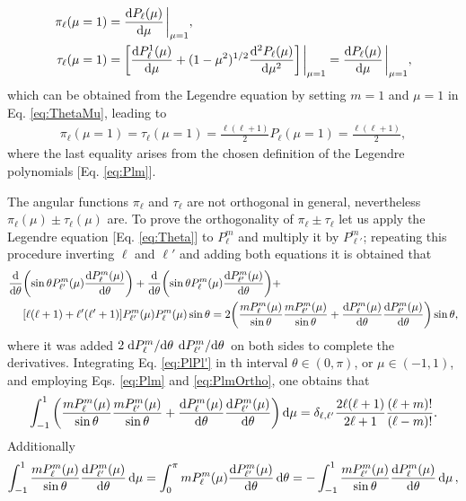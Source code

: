 %
\begin{align}
\pi_\ell(\mu=1) & =  \dv{P_\ell(\mu)}{\mu}\eval_{\mu=1},\\
\tau_\ell (\mu = 1) & = \qty[\dv{P_\ell^1(\mu)}{\mu} + (1-\mu^2)^{1/2}\dv[2]{P_\ell(\mu)}{\mu}]\eval_{\mu=1} = \dv{P_\ell(\mu)}{\mu}\eval_{\mu=1},
\end{align}
%
which can be obtained from the Legendre equation  by setting $m = 1$ and $\mu = 1$ in Eq. \eqref{eq:ThetaMu}, leading to
%
\begin{align}
    \pi_\ell(\mu=1) = \tau_\ell(\mu=1) = \frac{\ell(\ell+1)}{2} P_\ell(\mu = 1) = \frac{\ell(\ell+1)}{2},
    \label{eq:PiTau1}
\end{align}
%
where the last equality arises from the chosen definition of the Legendre polynomials [Eq. \eqref{eq:Plm}].

The angular functions $\pi_\ell$  and $\tau_\ell$ are not orthogonal in general, nevertheless  $\pi_\ell(\mu)\pm\tau_\ell(\mu)$ are. To prove the orthogonality of $\pi_\ell\pm\tau_\ell$ let us apply the Legendre equation [Eq. \eqref{eq:Theta}] to $P_\ell^m$ and multiply it by $P_{\ell'}^m$; repeating this procedure inverting $\ell$ and $\ell'$ and adding both equations it is obtained that
%
\begin{align}
\dv{\theta}&\qty(\sin\theta P_{\ell'}^m(\mu)\dv{P_\ell^m(\mu)}{\theta}) +
\dv{\theta}\qty(\sin\theta P_{\ell}^m(\mu)\dv{P_{\ell'}^m(\mu)}{\theta}) +
\label{eq:PlPl'}
\\
&\qty[\ell(\ell+1)+\ell'(\ell'+1)]P_{\ell'}^m(\mu)P_{\ell}^m(\mu) \sin\theta
=
 2\qty(\frac{mP_\ell^m(\mu)}{\sin\theta}\frac{mP_{\ell'}^m(\mu)}{\sin\theta}+ \dv{P_\ell^m(\mu)}{\theta}\dv{P_{\ell'}^m(\mu)}{\theta})\sin\theta,\notag
\end{align}
%
where  it was added $2\dv*{P_\ell^m}{\theta}\dv*{P_{\ell'}^m}{\theta}$ on both sides to complete the derivatives. Integrating Eq. \eqref{eq:PlPl'} in th interval $\theta \in (0,\pi)$, or $\mu \in(-1,1)$, and employing Eqs. \eqref{eq:Plm} and \eqref{eq:PlmOrtho}, one obtains that
%
\begin{align}
\int_{-1}^1 \qty(\frac{mP_\ell^m(\mu)}{\sin\theta}\frac{mP_{\ell'}^m(\mu)}{\sin\theta}+ \dv{P_\ell^m(\mu)}{\theta}\dv{P_{\ell'}^m(\mu)}{\theta})\dd{\mu} =
\delta_{\ell,\ell'}\frac{2\ell(\ell+1)}{2\ell+1}\frac{(\ell+m)!}{(\ell-m)!}.
\label{eq:PimlTauml}
\end{align}
%
Additionally
%
\begin{align}
\int_{-1}^1\frac{mP_\ell^m(\mu)}{\sin\theta}\dv{P_{\ell'}^m(\mu)}{\theta}\dd{\mu}
 = \int_0^{\pi} mP_\ell^m(\mu)\dv{P_{\ell'}^m(\mu)}{\theta}\dd{\theta} =
 -\int_{-1}^1\frac{mP_{\ell'}^m(\mu)}{\sin\theta}\dv{P_{\ell}^m(\mu)}{\theta}\dd{\mu},
 \label{eq:taupiCross}
\end{align}
